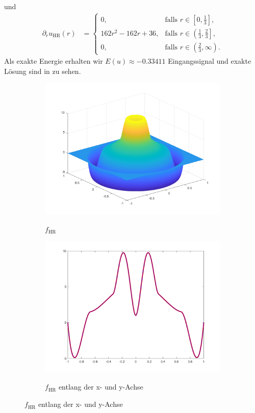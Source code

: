 und
\begin{align*}
  \partial_r u_\textrm{HR}(r) &=
  \begin{cases}
    0,
    & \text{falls } r\in\left[0, \frac{1}{3}\right]\!,\\
    162r^2 - 162r + 36, 
    & \text{falls } r\in\left(\frac{1}{3}, \frac{2}{3}\right]\!,\\
    0, 
    & \text{falls } r\in\left(\frac{2}{3}, \infty\right)\!.
  \end{cases}
\end{align*}
Als exakte Energie erhalten wir
$E(u)\approx -0.33411$
Eingangssignal und exakte Lösung sind in  zu sehen.
\begin{figure}[p]
  \centering
  \begin{subfigure}[b]{.48\linewidth}
    \centering
    \caption{$f_\textrm{HR}$}
    \includegraphics[trim = 40 30 30 30, clip, width=\linewidth]
      {pictures/chapExperiments/secExactSol/f04/inSi.png}
    \label{fig:f04InSi}
  \end{subfigure}
  \quad
  \begin{subfigure}[b]{.48\linewidth}
    \centering
    \caption{$f_\textrm{HR}$ entlang der x- und y-Achse}
    \includegraphics[trim = 50 30 50 20, clip, width=\linewidth]
      {pictures/chapExperiments/secExactSol/f04/inSiAxis.png}
    \label{fig:f04InSiAxis}
  \end{subfigure}


\end{figure}
